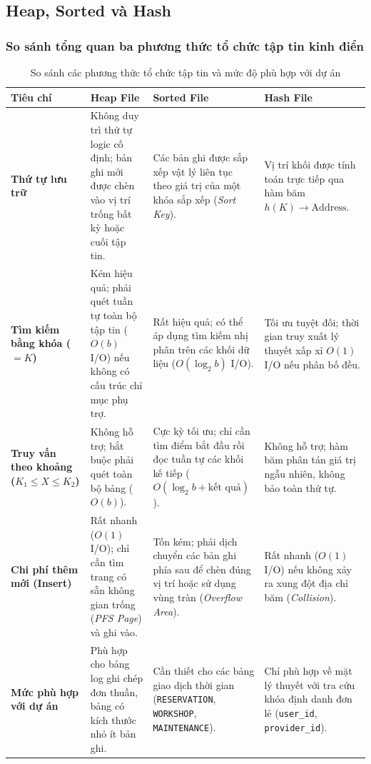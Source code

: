 \subsection{Heap, Sorted và Hash}

\subsubsection{So sánh tổng quan ba phương thức tổ chức tập tin kinh điển}

\begin{table}[htbp]
\centering
\label{tab:file_org_comparison}
\renewcommand{\arraystretch}{1.3}
\scriptsize
\setlength{\tabcolsep}{4pt}
\begin{tabular}{|p{2.2cm}|p{3.1cm}|p{3.1cm}|p{3.1cm}|}
\hline
\textbf{Tiêu chí} & \textbf{Heap File} & \textbf{Sorted File} & \textbf{Hash File} \\
\hline
\textbf{Thứ tự lưu trữ} &
Không duy trì thứ tự logic cố định; bản ghi mới được chèn vào vị trí trống bất kỳ hoặc cuối tập tin. &
Các bản ghi được sắp xếp vật lý liên tục theo giá trị của một khóa sắp xếp (\textit{Sort Key}). &
Vị trí khối được tính toán trực tiếp qua hàm băm $h(K) \rightarrow \text{Address}$. \\
\hline
\textbf{Tìm kiếm bằng khóa ($= K$)} &
Kém hiệu quả; phải quét tuần tự toàn bộ tập tin ($O(b)$ I/O) nếu không có cấu trúc chỉ mục phụ trợ. &
Rất hiệu quả; có thể áp dụng tìm kiếm nhị phân trên các khối dữ liệu ($O(\log_2 b)$ I/O). &
Tối ưu tuyệt đối; thời gian truy xuất lý thuyết xấp xỉ $O(1)$ I/O nếu phân bố đều. \\
\hline
\textbf{Truy vấn theo khoảng ($K_1 \le X \le K_2$)} &
Không hỗ trợ; bắt buộc phải quét toàn bộ bảng ($O(b)$). &
Cực kỳ tối ưu; chỉ cần tìm điểm bắt đầu rồi đọc tuần tự các khối kế tiếp ($O(\log_2 b + \text{kết quả})$). &
Không hỗ trợ; hàm băm phân tán giá trị ngẫu nhiên, không bảo toàn thứ tự. \\
\hline
\textbf{Chi phí thêm mới (Insert)} &
Rất nhanh ($O(1)$ I/O); chỉ cần tìm trang có sẵn không gian trống (\textit{PFS Page}) và ghi vào. &
Tốn kém; phải dịch chuyển các bản ghi phía sau để chèn đúng vị trí hoặc sử dụng vùng tràn (\textit{Overflow Area}). &
Rất nhanh ($O(1)$ I/O) nếu không xảy ra xung đột địa chỉ băm (\textit{Collision}). \\
\hline
\textbf{Mức phù hợp với dự án} &
Phù hợp cho bảng log ghi chép đơn thuần, bảng có kích thước nhỏ ít bản ghi. &
Cần thiết cho các bảng giao dịch thời gian (\texttt{RESERVATION}, \texttt{WORKSHOP}, \texttt{MAINTENANCE}). &
Chỉ phù hợp về mặt lý thuyết với tra cứu khóa định danh đơn lẻ (\texttt{user\_id}, \texttt{provider\_id}). \\
\hline
\end{tabular}
\caption{So sánh các phương thức tổ chức tập tin và mức độ phù hợp với dự án}
\end{table}

